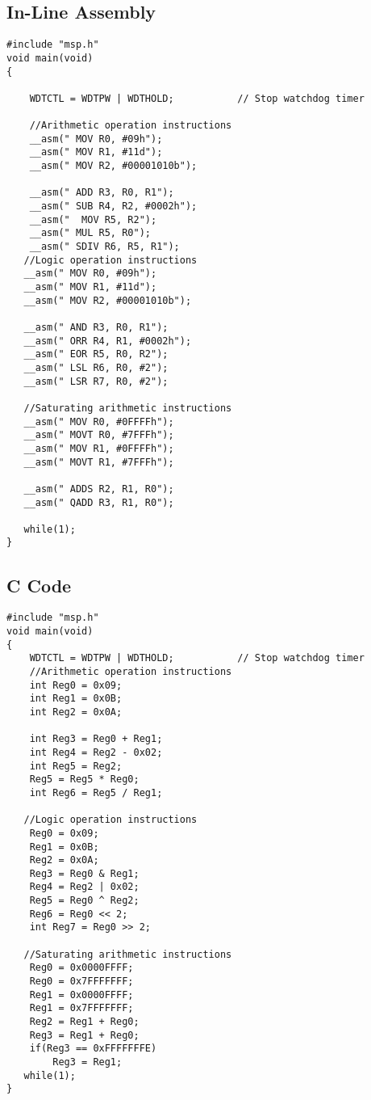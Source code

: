 \documentclass[11pt]{article}
\begin{document}
\subsection{In-Line Assembly}
\begin{lstlisting}
#include "msp.h"
void main(void)
{
	
    WDTCTL = WDTPW | WDTHOLD;           // Stop watchdog timer

    //Arithmetic operation instructions
    __asm(" MOV R0, #09h"); 
    __asm(" MOV R1, #11d"); 
    __asm(" MOV R2, #00001010b"); 

    __asm(" ADD R3, R0, R1"); 
    __asm(" SUB R4, R2, #0002h"); 
    __asm("  MOV R5, R2"); 
    __asm(" MUL R5, R0"); 
    __asm(" SDIV R6, R5, R1"); 
   //Logic operation instructions
   __asm(" MOV R0, #09h"); 
   __asm(" MOV R1, #11d"); 
   __asm(" MOV R2, #00001010b"); 

   __asm(" AND R3, R0, R1"); 
   __asm(" ORR R4, R1, #0002h"); 
   __asm(" EOR R5, R0, R2"); 
   __asm(" LSL R6, R0, #2"); 
   __asm(" LSR R7, R0, #2"); 

   //Saturating arithmetic instructions
   __asm(" MOV R0, #0FFFFh");
   __asm(" MOVT R0, #7FFFh");
   __asm(" MOV R1, #0FFFFh");
   __asm(" MOVT R1, #7FFFh"); 

   __asm(" ADDS R2, R1, R0");
   __asm(" QADD R3, R1, R0");

   while(1);
}
\end{lstlisting}
\subsection{C Code}
\begin{lstlisting}
#include "msp.h"
void main(void)
{
    WDTCTL = WDTPW | WDTHOLD;           // Stop watchdog timer
    //Arithmetic operation instructions
    int Reg0 = 0x09; 
    int Reg1 = 0x0B; 
    int Reg2 = 0x0A; 

    int Reg3 = Reg0 + Reg1; 
    int Reg4 = Reg2 - 0x02; 
    int Reg5 = Reg2; 
    Reg5 = Reg5 * Reg0; 
    int Reg6 = Reg5 / Reg1;

   //Logic operation instructions
    Reg0 = 0x09; 
    Reg1 = 0x0B; 
    Reg2 = 0x0A; 
    Reg3 = Reg0 & Reg1; 
    Reg4 = Reg2 | 0x02; 
    Reg5 = Reg0 ^ Reg2; 
    Reg6 = Reg0 << 2;
    int Reg7 = Reg0 >> 2; 

   //Saturating arithmetic instructions
    Reg0 = 0x0000FFFF; 
    Reg0 = 0x7FFFFFFF; 
    Reg1 = 0x0000FFFF; 
    Reg1 = 0x7FFFFFFF; 
    Reg2 = Reg1 + Reg0; 
    Reg3 = Reg1 + Reg0; 
    if(Reg3 == 0xFFFFFFFE)
        Reg3 = Reg1; 
   while(1);
}
\end{lstlisting}
\end{document}
